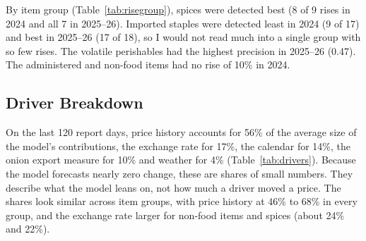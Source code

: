 \begin{table}[H]\centering\small
\caption[Alerts against TCB price rises]{Alerts scored against rises in TCB prices (rise over 14 report days kept for 5 report days). Recall is the share of rises with a matched alert run, precision the share of alert runs that matched a rise, and the last column (random recall) the mean recall when the alert dates were shifted at random (300 draws). The 10\% rule was fixed before scoring; 7\% and 15\% are sensitivity checks. 2025--26 (retro.) is retrospective because the earlier version of this study had already scored it.}\label{tab:rise}

\par{}
\end{table}

By item group (Table~\ref{tab:risegroup}), spices were detected best (8 of 9 rises in 2024 and all 7 in 2025--26). Imported staples were detected least in 2024 (9 of 17) and best in 2025--26 (17 of 18), so I would not read much into a single group with so few rises. The volatile perishables had the highest precision in 2025--26 (0.47). The administered and non-food items had no rise of 10\% in 2024.

\begin{table}[H]\centering\small
\caption[Alerts against TCB price rises by item group]{Alerts against TCB price rises by item group, 10\% rule.}\label{tab:risegroup}

\par{}
\end{table}

\subsection{Driver Breakdown}
On the last 120 report days, price history accounts for 56\% of the average size of the model's contributions, the exchange rate for 17\%, the calendar for 14\%, the onion export measure for 10\% and weather for 4\% (Table~\ref{tab:drivers}). Because the model forecasts nearly zero change, these are shares of small numbers. They describe what the model leans on, not how much a driver moved a price. The shares look similar across item groups, with price history at 46\% to 68\% in every group, and the exchange rate larger for non-food items and spices (about 24\% and 22\%).

\begin{table}[H]\centering\small
\caption[Driver group shares, last 120 report days]{Share of the average absolute contribution by driver group, last 120 report days.}\label{tab:drivers}

\par{}
\end{table}

